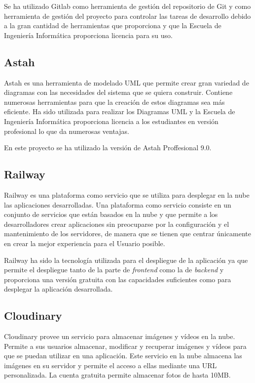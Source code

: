 Se ha utilizado Gitlab como herramienta de gestión del repositorio de Git y como herramienta de gestión del proyecto para controlar las tareas de desarrollo debido a la gran cantidad de herramientas que proporciona y que la Escuela de Ingeniería Informática proporciona licencia para su uso. 





\subsection{Astah}
Astah \cite{astah} es una herramienta de modelado UML que permite crear gran variedad de diagramas con las necesidades del sistema que se quiera construir. Contiene numerosas herramientas para que la creación de estos diagramas sea más eficiente. Ha sido utilizada para realizar los Diagramas UML y la Escuela de Ingeniería Informática proporciona licencia a los estudiantes en versión profesional lo que da numerosas ventajas.

En este proyecto se ha utilizado la versión de Astah Proffesional 9.0.



\subsection{Railway}
Railway \cite{railway} es una plataforma como servicio que se utiliza para desplegar en la nube las aplicaciones desarrolladas. Una plataforma como servicio \cite{paas} consiste en un conjunto de servicios que están basados en la nube y que permite a los desarrolladores crear aplicaciones sin preocuparse por la configuración y el mantenimiento de los servidores, de manera que se tienen que centrar únicamente en crear la mejor experiencia para el Usuario posible.

Railway ha sido la tecnología utilizada para el despliegue de la aplicación ya que permite el despliegue tanto de la parte de \textit{frontend} como la de \textit{backend} y proporciona una versión gratuita con las capacidades suficientes como para desplegar la aplicación desarrollada.

\subsection{Cloudinary}
Cloudinary \cite{cloudinary} provee un servicio para almacenar imágenes y vídeos en la nube. Permite a sus usuarios almacenar, modificar y recuperar imágenes y vídeos para que se puedan utilizar en una aplicación. Este servicio en la nube almacena las imágenes en su servidor y permite el acceso a ellas mediante una URL personalizada. La cuenta gratuita permite almacenar fotos de hasta 10MB.


